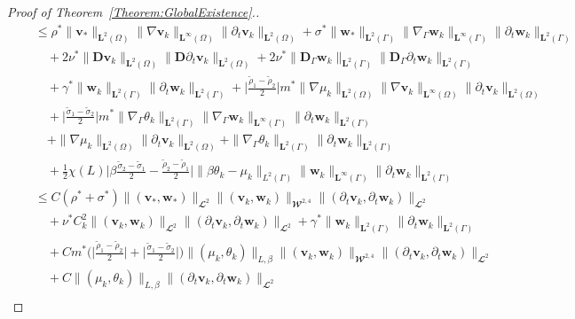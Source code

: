 \documentclass[10pt,reqno]{amsart}
\theoremstyle{remark}
\numberwithin{equation}{section}
\newcommand{\Bigabs}[1]{\Big| #1 \Big|}
\newcommand{\norm}[1]{\| #1 \|}
\newcommand{\bv}{\mathbf{v}}
\newcommand{\bw}{\mathbf{w}}
\newcommand{\D}{\mathbf{D}}
\newcommand{\Dg}{\mathbf{D}_\Gamma}
\newcommand{\delt}{\partial_{t}}
\newcommand{\Grad}{\nabla}
\newcommand{\Gradg}{\nabla_\Ga}
\newcommand{\Om}{\Omega}
\newcommand{\Ga}{\Gamma}
\begin{document}
\begin{proof}[Proof of Theorem~\ref{Theorem:GlobalExistence}.]
\begin{align}
    &\quad\leq\rho^\ast\norm{\bv_\ast}_{\mathbf{L}^2(\Om)}\norm{\Grad\bv_k}_{\mathbf{L}^\infty(\Om)}\norm{\delt\bv_k}_{\mathbf{L}^2(\Om)} + \sigma^\ast\norm{\bw_\ast}_{\mathbf{L}^2(\Ga)}\norm{\Gradg\bw_k}_{\mathbf{L}^\infty(\Ga)}\norm{\delt\bw_k}_{\mathbf{L}^2(\Ga)} \nonumber \\[0.3em]
    &\qquad  + 2\nu^\ast\norm{\D\bv_k}_{\mathbf{L}^2(\Om)}\norm{\D\delt\bv_k}_{\mathbf{L}^2(\Om)} + 2\nu^\ast\norm{\Dg\bw_k}_{\mathbf{L}^2(\Ga)}\norm{\Dg\delt\bw_k}_{\mathbf{L}^2(\Ga)} \nonumber \\[0.3em]
    &\qquad + \gamma^\ast\norm{\bw_k}_{\mathbf{L}^2(\Ga)}\norm{\delt\bw_k}_{\mathbf{L}^2(\Ga)} + \Bigabs{\frac{\tilde\rho_1 - \tilde\rho_2}{2}}m^\ast\norm{\Grad\mu_k}_{\mathbf{L}^2(\Om)}\norm{\Grad\bv_k}_{\mathbf{L}^\infty(\Om)}\norm{\delt\bv_k}_{\mathbf{L}^2(\Om)} \nonumber \\[0.3em]
    &\qquad + \Bigabs{\frac{\tilde\sigma_1 - \tilde\sigma_2}{2}}m^\ast\norm{\Gradg\theta_k}_{\mathbf{L}^2(\Ga)}\norm{\Gradg\bw_k}_{\mathbf{L}^\infty(\Ga)}\norm{\delt\bw_k}_{\mathbf{L}^2(\Ga)} \nonumber \\[0.3em]
    &\qquad + \norm{\Grad\mu_k}_{\mathbf{L}^2(\Om)}\norm{\delt\bv_k}_{\mathbf{L}^2(\Om)} + \norm{\Gradg\theta_k}_{\mathbf{L}^2(\Ga)}\norm{\delt\bw_k}_{\mathbf{L}^2(\Ga)} \nonumber \\[0.2em]
    &\qquad + \tfrac12\chi(L)\Bigabs{\beta\frac{\tilde\sigma_2 - \tilde\sigma_1}{2} - \frac{\tilde\rho_2 - \tilde\rho_1}{2}}\norm{\beta\theta_k - \mu_k}_{L^2(\Ga)}\norm{\bw_k}_{\mathbf{L}^\infty(\Ga)}\norm{\delt\bw_k}_{\mathbf{L}^2(\Ga)} \nonumber \\[0.4em]
    &\quad\leq C(\rho^\ast + \sigma^\ast) \norm{(\bv_\ast,\bw_\ast)}_{\mathbfcal{L}^2}\norm{(\bv_k,\bw_k)}_{\mathbfcal{W}^{2,4}}\norm{(\delt\bv_k,\delt\bw_k)}_{\mathbfcal{L}^2} \nonumber \\[0.3em]
    &\qquad + \nu^\ast C_k^2\norm{(\bv_k,\bw_k)}_{\mathbfcal{L}^2}\norm{(\delt\bv_k,\delt\bw_k)}_{\mathbfcal{L}^2} + \gamma^\ast\norm{\bw_k}_{\mathbf{L}^2(\Ga)}\norm{\delt\bw_k}_{\mathbf{L}^2(\Ga)} \\[0.3em]
    &\qquad + Cm^\ast\bigg(\Bigabs{\frac{\tilde\rho_1 - \tilde\rho_2}{2}} + \Bigabs{\frac{\tilde\sigma_1 - \tilde\sigma_2}{2}}\bigg)\norm{(\mu_k, \theta_k)}_{L,\beta}\norm{(\bv_k,\bw_k)}_{\mathbfcal{W}^{2,4}}\norm{(\delt\bv_k,\delt\bw_k)}_{\mathbfcal{L}^2} \nonumber \\[0.3em]
    &\qquad + C\norm{(\mu_k,\theta_k)}_{L,\beta}\norm{(\delt\bv_k,\delt\bw_k)}_{\mathbfcal{L}^2} \nonumber \\[0.3em]

\end{align}
\end{proof}
\end{document}
